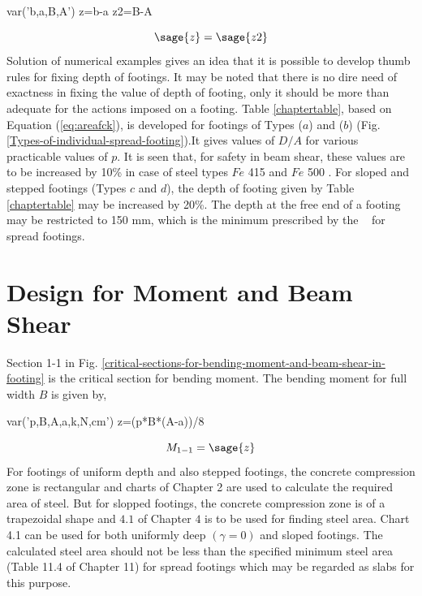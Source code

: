 \documentclass{report}
\newcommand{\figmacro}[1] {Fig. #1}
\newcommand{\equmacro}[1] {Equation #1}
\newcommand{\chartmacro}[1] {Chart #1}
\newcommand{\tablemacro}[1] {Table #1}
\newcommand{\Fefouronefivemacro}[1] {$Fe$ 415 #1}
\newcommand{\Fefivezerozeromacro}[1] {$Fe$ 500 #1}
\begin{document}
\begin{sagesilent}                                                      
        var('b,a,B,A')                                                
        z=b-a
        z2=B-A                                                    
\end{sagesilent}

\begin{equation}
  \label{eq:equaloverhang}
           \sage{z}=\sage{z2} 
\end{equation}
Solution of numerical examples gives an idea that it is possible to develop
thumb rules for fixing depth of footings. It may be noted that there is no
dire need of exactness in fixing the value of depth of footing, only it
should be more than adequate for the actions imposed on a footing. \tablemacro \ref{chaptertable}, based on \equmacro (\ref{eq:areafck}), is developed for footings of Types ($a$) and
($b$) (\figmacro \ref{Types-of-individual-spread-footing}).It gives values of $D/A$ for various practicable values of $p$. It
is seen that, for safety in beam shear, these values are to be increased by
10\% in case of steel types \Fefouronefivemacro and \Fefivezerozeromacro. For sloped and
stepped footings (Types $c$ and $d$), the depth of footing given by \tablemacro \ref{chaptertable}
may be increased by 20\%. The depth at the free end of a footing may be
restricted to 150 mm, which is the minimum prescribed by the ~ for spread
footings.
 



 \section{Design for Moment and Beam Shear} 
 Section 1-1 in \figmacro \ref{critical-sections-for-bending-moment-and-beam-shear-in-footing} is the critical  section for bending moment. The bending moment
for full width $B$ is given by,

\begin{sagesilent}                                                      
        var('p,B,A,a,k,N,cm')                                                
        z=(p*B*(A-a))/8                                           
\end{sagesilent}  

\begin{equation}
        \label{eq:criticalMoment}
        M_{1-1}=\sage{z}
\end{equation}
For footings of uniform depth and also stepped footings, the concrete compression zone is
rectangular and charts of Chapter 2 are used to calculate the required area of steel. But for slopped footings, the concrete compression zone is of a trapezoidal shape and \chartmacro $4.1$ of Chapter $4$ is to be used for finding steel area. 
\chartmacro 4.1 can be used for both uniformly deep $(\gamma = 0)$ and sloped footings.
The calculated steel area should not be less than the 
speciﬁed minimum steel area (\tablemacro 11.4 of Chapter 11)
for spread footings which may be regarded as slabs for this purpose.
\end{document}
